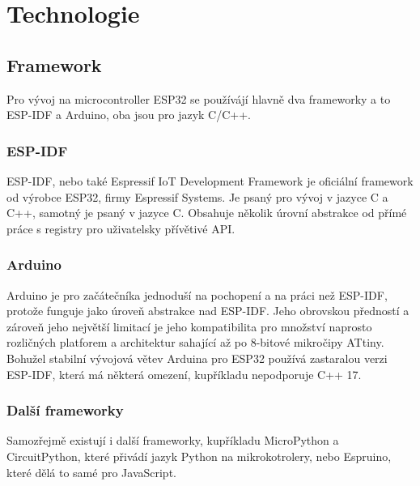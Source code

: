 \chapter{Technologie}

\section{Framework}

Pro vývoj na microcontroller ESP32 se používájí hlavně dva frameworky a to ESP-IDF\cite{ESP-IDF} a Arduino\cite{arduino}, oba jsou pro jazyk C/C++.

\subsection{ESP-IDF}

ESP-IDF, nebo také Espressif IoT Development Framework je oficiální framework od výrobce ESP32, firmy Espressif Systems\cite{espressif}.
Je psaný pro vývoj v jazyce C a C++, samotný je psaný v jazyce C.
Obsahuje několik úrovní abstrakce od přímé práce s registry pro uživatelsky přívětivé API.





\subsection{Arduino}

Arduino je pro začátečníka jednoduší na pochopení a na práci než ESP-IDF, protože funguje jako úroveň abstrakce nad ESP-IDF.
Jeho obrovskou předností a zároveň jeho největší limitací je jeho kompatibilita pro množství naprosto rozličných platforem a architektur sahající až po 8-bitové mikročipy ATtiny. Bohužel stabilní vývojová větev Arduina pro ESP32 používá zastaralou verzi ESP-IDF, která má některá omezení, kupříkladu nepodporuje C++ 17.



\subsection{Další frameworky}

Samozřejmě existují i další frameworky, kupříkladu MicroPython\cite{uPython} a CircuitPython\cite{circuitPython}, které přivádí jazyk Python na mikrokotrolery, nebo Espruino\cite{espruino}, které dělá to samé pro JavaScript.

